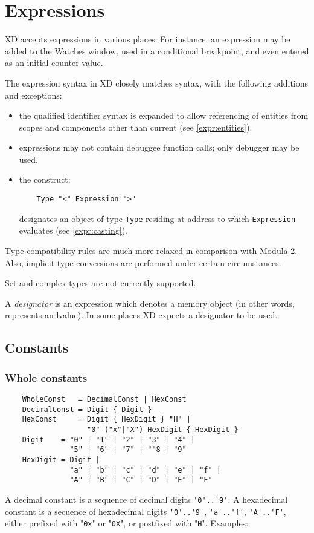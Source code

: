 \chapter{Expressions}
\label{expr}

XD accepts expressions in various places. For instance, an expression
may be added to the Watches window, used in a conditional breakpoint,
and even entered as an initial counter value.

The expression syntax in XD closely matches \mt{} syntax, with the 
following additions and exceptions:
\begin{itemize}
\item the qualified identifier syntax is expanded to allow referencing of
      entities from scopes and components other than current 
      (see \ref{expr:entities}).
\item expressions may not contain debuggee function calls; only
      debugger  may be used.
\item the construct:

\verb'    Type "<" Expression ">"'

      designates an object of type \verb'Type' residing at address
      to which \verb'Expression' evaluates (see \ref{expr:casting}).
\end{itemize}

Type compatibility rules are much more relaxed in comparison
with Modula-2. Also, implicit type conversions are performed
under certain circumstances.

Set and complex types are not currently supported.

A {\it designator} is an expression which denotes a memory
object (in other words, represents an lvalue). In some places XD expects
a designator to be used.

\section{Constants}

\subsection{Whole constants}

\begin{verbatim}
    WholeConst   = DecimalConst | HexConst
    DecimalConst = Digit { Digit }
    HexConst     = Digit { HexDigit } "H" |
                   "0" ("x"|"X") HexDigit { HexDigit }
    Digit    = "0" | "1" | "2" | "3" | "4" |
               "5" | "6" | "7" | ""8 | "9"
    HexDigit = Digit |
               "a" | "b" | "c" | "d" | "e" | "f" |
               "A" | "B" | "C" | "D" | "E" | "F"
\end{verbatim}
A decimal constant is a sequence of decimal digits \verb"'0'..'9'".
A hexadecimal constant is a secuence of hexadecimal digits \verb"'0'..'9'",
\verb"'a'..'f'", \verb"'A'..'F'", either prefixed with "\verb'0x'"
or "\verb'0X'", or postfixed with "\verb'H'". Examples:


